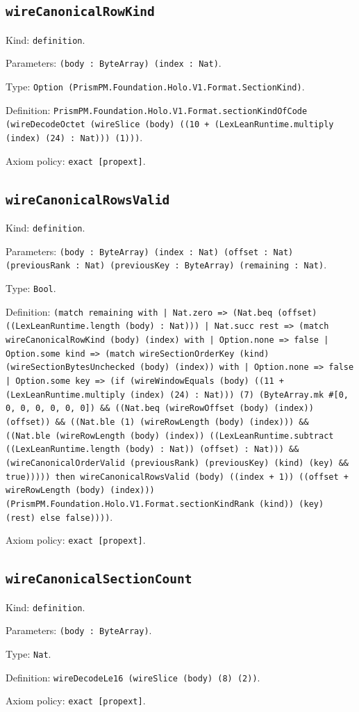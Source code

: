 \documentclass[11pt]{article}
\begin{document}
\subsection*{\texttt{wireCanonicalRowKind}}
\noindent Kind: \texttt{definition}.\par
\noindent Parameters: \texttt{(body : ByteArray) (index : Nat)}.\par
\noindent Type: \texttt{Option (PrismPM.Foundation.Holo.V1.Format.SectionKind)}.\par
\noindent Definition: \texttt{PrismPM.Foundation.Holo.V1.Format.sectionKindOfCode (wireDecodeOctet (wireSlice (body) ((10 + (LexLeanRuntime.multiply (index) (24) : Nat))) (1)))}.\par
\noindent Axiom policy: \texttt{exact [propext]}.\par
\subsection*{\texttt{wireCanonicalRowsValid}}
\noindent Kind: \texttt{definition}.\par
\noindent Parameters: \texttt{(body : ByteArray) (index : Nat) (offset : Nat) (previousRank : Nat) (previousKey : ByteArray) (remaining : Nat)}.\par
\noindent Type: \texttt{Bool}.\par
\noindent Definition: \texttt{(match remaining with | Nat.zero => (Nat.beq (offset) ((LexLeanRuntime.length (body) : Nat))) | Nat.succ rest => (match wireCanonicalRowKind (body) (index) with | Option.none => false | Option.some kind => (match wireSectionOrderKey (kind) (wireSectionBytesUnchecked (body) (index)) with | Option.none => false | Option.some key => (if (wireWindowEquals (body) ((11 + (LexLeanRuntime.multiply (index) (24) : Nat))) (7) (ByteArray.mk \#[0, 0, 0, 0, 0, 0, 0]) \&\& ((Nat.beq (wireRowOffset (body) (index)) (offset)) \&\& ((Nat.ble (1) (wireRowLength (body) (index))) \&\& ((Nat.ble (wireRowLength (body) (index)) ((LexLeanRuntime.subtract ((LexLeanRuntime.length (body) : Nat)) (offset) : Nat))) \&\& (wireCanonicalOrderValid (previousRank) (previousKey) (kind) (key) \&\& true))))) then wireCanonicalRowsValid (body) ((index + 1)) ((offset + wireRowLength (body) (index))) (PrismPM.Foundation.Holo.V1.Format.sectionKindRank (kind)) (key) (rest) else false))))}.\par
\noindent Axiom policy: \texttt{exact [propext]}.\par
\subsection*{\texttt{wireCanonicalSectionCount}}
\noindent Kind: \texttt{definition}.\par
\noindent Parameters: \texttt{(body : ByteArray)}.\par
\noindent Type: \texttt{Nat}.\par
\noindent Definition: \texttt{wireDecodeLe16 (wireSlice (body) (8) (2))}.\par
\noindent Axiom policy: \texttt{exact [propext]}.\par
\end{document}
